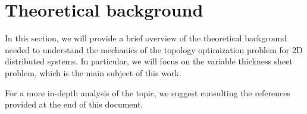\section{Theoretical background}
\label{sec:theoretical_background}

In this section, we will provide a brief overview of the theoretical background needed to understand the mechanics of the topology optimization problem for 2D distributed systems.
In particular, we will focus on the variable thickness sheet problem, which is the main subject of this work.

For a more in-depth analysis of the topic, we suggest consulting the references provided at the end of this document.




